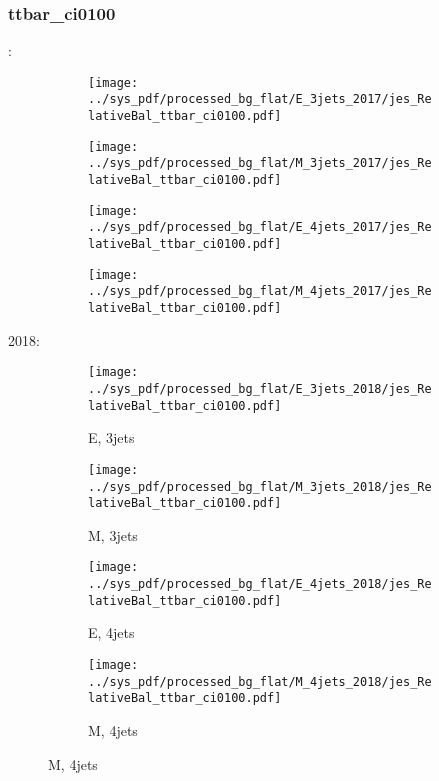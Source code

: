 \documentclass{beamer}
\begin{document}
\begin{frame}
\frametitle{ttbar_ci0100}
\fontsize{5}{1}:
\begin{figure}
\centering
\begin{subfigure}[b]{0.24\textwidth}
\texttt{[image: ../sys\_pdf/processed\_bg\_flat/E\_3jets\_2017/jes\_RelativeBal\_ttbar\_ci0100.pdf]}
\end{subfigure}
\begin{subfigure}[b]{0.24\textwidth}
\texttt{[image: ../sys\_pdf/processed\_bg\_flat/M\_3jets\_2017/jes\_RelativeBal\_ttbar\_ci0100.pdf]}
\end{subfigure}
\begin{subfigure}[b]{0.24\textwidth}
\texttt{[image: ../sys\_pdf/processed\_bg\_flat/E\_4jets\_2017/jes\_RelativeBal\_ttbar\_ci0100.pdf]}
\end{subfigure}
\begin{subfigure}[b]{0.24\textwidth}
\texttt{[image: ../sys\_pdf/processed\_bg\_flat/M\_4jets\_2017/jes\_RelativeBal\_ttbar\_ci0100.pdf]}
\end{subfigure}
\end{figure}
2018:
\begin{figure}
\centering
\begin{subfigure}[b]{0.24\textwidth}
\texttt{[image: ../sys\_pdf/processed\_bg\_flat/E\_3jets\_2018/jes\_RelativeBal\_ttbar\_ci0100.pdf]}
\captionsetup{font=tiny}
\caption{E, 3jets}
\end{subfigure}
\begin{subfigure}[b]{0.24\textwidth}
\texttt{[image: ../sys\_pdf/processed\_bg\_flat/M\_3jets\_2018/jes\_RelativeBal\_ttbar\_ci0100.pdf]}
\captionsetup{font=tiny}
\caption{M, 3jets}
\end{subfigure}
\begin{subfigure}[b]{0.24\textwidth}
\texttt{[image: ../sys\_pdf/processed\_bg\_flat/E\_4jets\_2018/jes\_RelativeBal\_ttbar\_ci0100.pdf]}
\captionsetup{font=tiny}
\caption{E, 4jets}
\end{subfigure}
\begin{subfigure}[b]{0.24\textwidth}
\texttt{[image: ../sys\_pdf/processed\_bg\_flat/M\_4jets\_2018/jes\_RelativeBal\_ttbar\_ci0100.pdf]}
\captionsetup{font=tiny}
\caption{M, 4jets}
\end{subfigure}
\end{figure}
\end{frame}
\end{document}
